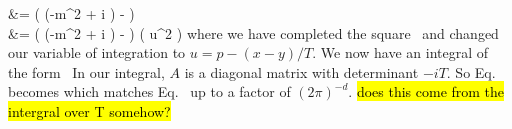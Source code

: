 \documentclass[11pt]{article}
\begin{document}
{{		&= \intoi \ddT \exp(  (-m^2 + i \eps) -  ) \intnii \dddp {} \notag \\
		&= \intoi \ddT \exp(  (-m^2 + i \eps) -  ) \intnii \dddu \exp(  u^2 ) \label{thing1a3}
	}
	where we have completed the square~\cite[p.~282]{Peskin} and changed our variable of integration to $u = p - (x - y) / T$.  We now have an integral of the form~\cite{QFT}
	In our integral, $A$ is a diagonal matrix with determinant $-i T$.  So Eq.~ becomes
	which matches Eq.~ up to a factor of $(2\pi)^{-d}$.  \hl{does this come from the intergral over T somehow?}
}


\clearpage
{}
\end{document}
